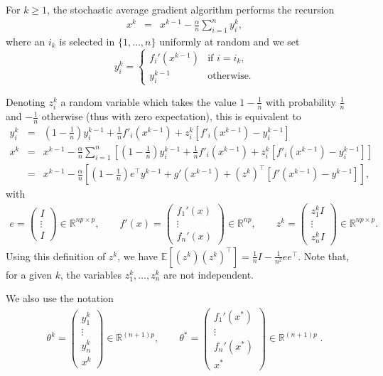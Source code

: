 \documentclass{article}
\newcommand{\BEAS}{\begin{eqnarray*}}
\newcommand{\EEAS}{\end{eqnarray*}}
\newcommand{\idm}{I}
\newcommand{\rb}{\mathbb{R}}
\def\E{_{\scriptscriptstyle E}}
\def \E{{\mathbb E}}
\def \E{{\mathbb E}}
\begin{document}
For $k\geqslant 1$, the stochastic average gradient algorithm performs the recursion
\BEAS
x^k & = & x^{k-1} - \frac{\alpha}{n} \sum_{i=1}^n y_i^{k},
\EEAS
where an $i_k$ is selected in $\{1,\dots,n\}$ uniformly at random and we set
\[
y^k_i = \begin{cases}
f_i'(x^{k-1}) & \textrm{if $i = i_k$,}\\
y^{k-1}_i & \textrm{otherwise.}
\end{cases}
\]

Denoting $z^k_i$ a random variable which takes the value $1-\frac{1}{n}$ with probability $\frac{1}{n}$ and $-\frac{1}{n}$ otherwise (thus with zero expectation), this is equivalent to
\BEAS
y_i^k & = & \left(1-\frac{1}{n}\right) y_i^{k-1} + \frac{1}{n}f'_{i}(x^{k-1}) + z^k_i \left[  f'_{i}(x^{k-1}) - y_i^{k-1}\right] \\
x^k & = & x^{k-1} - \frac{\alpha}{n} \sum_{i=1}^n \left[\left(1-\frac{1}{n}\right) y_i^{k-1} + \frac{1}{n}f'_{i}(x^{k-1}) + z^k_i \left[  f'_{i}(x^{k-1}) - y_i^{k-1}\right]\right]\\
&=& x^{k-1} - \frac{\alpha}{n}\left[\left(1-\frac{1}{n}\right)e^\top y^{k-1} + g'(x^{k-1}) + (z^k)^\top \left[ f'(x^{k-1}) - y^{k-1}\right]\right],
\EEAS
with
\begin{align*}
e = \left(
\begin{array}{c}
\idm\\
\vdots\\
\idm
\end{array}\right) \in \rb^{n p \times p},
\qquad
f'(x) = \left(
\begin{array}{c}
f_1'(x)\\
\vdots\\
f_n'(x)
\end{array}\right) \in \rb^{n p},
\qquad
z^k =
\left(
\begin{array}{c}
z_1^k I\\
\vdots\\
z_n^k I
\end{array}\right) \in \rb^{np \times p}.
\end{align*}
Using this definition of $z^k$, we have $\E [(z^k) (z^k)^\top] = \frac{1}{n} \idm - \frac{1}{n^2} ee^\top$. Note that, for a given $k$, the variables $z_1^k,\dots,z_n^k$ are not independent.

We also use the notation
\begin{align*}
\theta^k =
\left(
\begin{array}{c}
y_1^k\\
\vdots\\
y_n^k\\
x^k
\end{array}\right) \in \rb^{(n+1)p},
\qquad
\theta^\ast =
\left(
\begin{array}{c}
f_1'(x^\ast)\\
\vdots\\
f_n'(x^\ast)\\
x^\ast
\end{array}\right) \in \rb^{(n+1)p} \; .
\end{align*}
\end{document}
